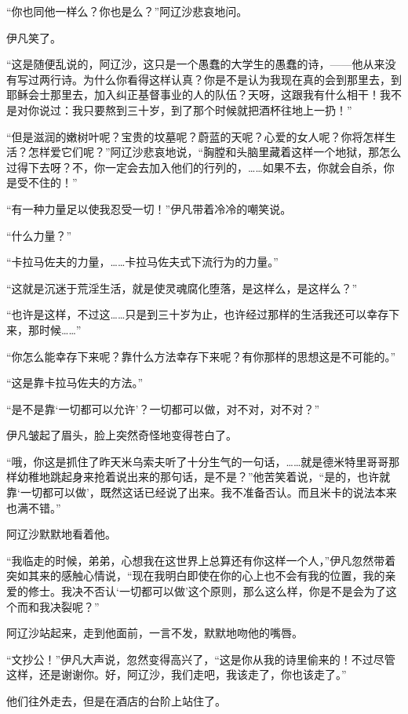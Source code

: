 \par “你也同他一样么？你也是么？”阿辽沙悲哀地问。
\par 伊凡笑了。
\par “这是随便乱说的，阿辽沙，这只是一个愚蠢的大学生的愚蠢的诗，——他从来没有写过两行诗。为什么你看得这样认真？你是不是认为我现在真的会到那里去，到耶稣会士那里去，加入纠正基督事业的人的队伍？天呀，这跟我有什么相干！我不是对你说过：我只要熬到三十岁，到了那个时候就把酒杯往地上一扔！”
\par “但是滋润的嫩树叶呢？宝贵的坟墓呢？蔚蓝的天呢？心爱的女人呢？你将怎样生活？怎样爱它们呢？”阿辽沙悲哀地说，“胸膛和头脑里藏着这样一个地狱，那怎么过得下去呀？不，你一定会去加入他们的行列的，……如果不去，你就会自杀，你是受不住的！”
\par “有一种力量足以使我忍受一切！”伊凡带着冷冷的嘲笑说。
\par “什么力量？”
\par “卡拉马佐夫的力量，……卡拉马佐夫式下流行为的力量。”
\par “这就是沉迷于荒淫生活，就是使灵魂腐化堕落，是这样么，是这样么？”
\par “也许是这样，不过这……只是到三十岁为止，也许经过那样的生活我还可以幸存下来，那时候……”
\par “你怎么能幸存下来呢？靠什么方法幸存下来呢？有你那样的思想这是不可能的。”
\par “这是靠卡拉马佐夫的方法。”
\par “是不是靠‘一切都可以允许’？一切都可以做，对不对，对不对？”
\par 伊凡皱起了眉头，脸上突然奇怪地变得苍白了。
\par “哦，你这是抓住了昨天米乌索夫听了十分生气的一句话，……就是德米特里哥哥那样幼稚地跳起身来抢着说出来的那句话，是不是？”他苦笑着说，“是的，也许就靠‘一切都可以做’，既然这话已经说了出来。我不准备否认。而且米卡的说法本来也满不错。”
\par 阿辽沙默默地看着他。
\par “我临走的时候，弟弟，心想我在这世界上总算还有你这样一个人，”伊凡忽然带着突如其来的感触心情说，“现在我明白即使在你的心上也不会有我的位置，我的亲爱的修士。我决不否认‘一切都可以做’这个原则，那么这么样，你是不是会为了这个而和我决裂呢？”
\par 阿辽沙站起来，走到他面前，一言不发，默默地吻他的嘴唇。
\par “文抄公！”伊凡大声说，忽然变得高兴了，“这是你从我的诗里偷来的！不过尽管这样，还是谢谢你。好，阿辽沙，我们走吧，我该走了，你也该走了。”
\par 他们往外走去，但是在酒店的台阶上站住了。
